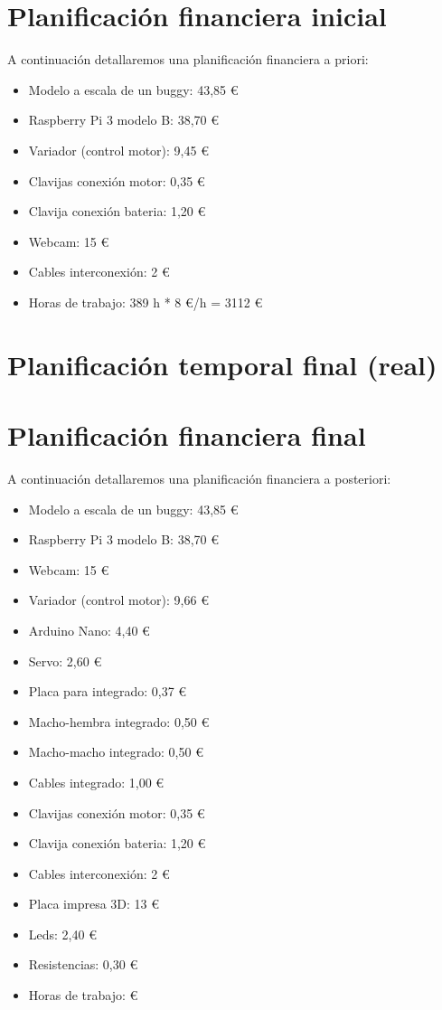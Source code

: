 \documentclass{pclass}
\begin{document}
\section{Planificación financiera inicial} 
A continuación detallaremos una planificación financiera a priori:
\begin{itemize}
    \item Modelo a escala de un buggy: 43,85 \euro
    \item Raspberry Pi 3 modelo B: 38,70 \euro
    \item Variador (control motor): 9,45 \euro
    \item Clavijas conexión motor: 0,35 \euro
    \item Clavija conexión bateria: 1,20 \euro
    \item Webcam: 15 \euro
    \item Cables interconexión: 2 \euro
    \item Horas de trabajo: 389 h * 8 \euro/h = 3112 \euro

\end{itemize}

\section{Planificación temporal final (real)} 

\section{Planificación financiera final} 

A continuación detallaremos una planificación financiera a posteriori:
\begin{itemize}
	\item Modelo a escala de un buggy: 43,85 \euro
	\item Raspberry Pi 3 modelo B: 38,70 \euro
	\item Webcam: 15 \euro
	\item Variador (control motor): 9,66 \euro
	\item Arduino Nano: 4,40 \euro
	\item Servo: 2,60 \euro
	\item Placa para integrado: 0,37 \euro
	\item Macho-hembra integrado: 0,50 \euro
	\item Macho-macho integrado: 0,50 \euro
	\item Cables integrado: 1,00 \euro
	\item Clavijas conexión motor: 0,35 \euro
	\item Clavija conexión bateria: 1,20 \euro
	\item Cables interconexión: 2 \euro
	\item Placa impresa 3D: 13 \euro
	\item Leds: 2,40 \euro
	\item Resistencias: 0,30 \euro
	\item Horas de trabajo: \euro

\end{itemize}
\end{document}
